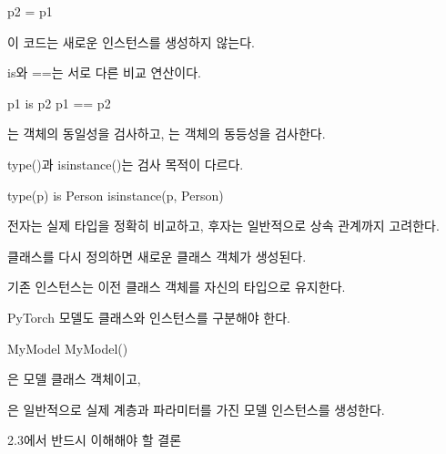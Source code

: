 \begin{dhkcode}
p2 = p1
\end{dhkcode}

이 코드는 새로운 인스턴스를 생성하지 않는다.

\begin{dhknote}
\begin{dhksmry}[centered]
is와 ==는 서로 다른 비교 연산이다.
\end{dhksmry}
\end{dhknote}

\begin{dhkcode}
p1 is p2
p1 == p2
\end{dhkcode}

는 객체의 동일성을 검사하고, \zsh{==}는 객체의 동등성을 검사한다.

\begin{dhknote}
\begin{dhksmry}[centered]
type()과 isinstance()는 검사 목적이 다르다.
\end{dhksmry}
\end{dhknote}

\begin{dhkcode}
type(p) is Person
isinstance(p, Person)
\end{dhkcode}

전자는 실제 타입을 정확히 비교하고, 후자는 일반적으로 상속 관계까지 고려한다.

\begin{dhknote}
\begin{dhksmry}[centered]
클래스를 다시 정의하면 새로운 클래스 객체가 생성된다.
\end{dhksmry}
\end{dhknote}

기존 인스턴스는 이전 클래스 객체를 자신의 타입으로 유지한다.

\begin{dhknote}
\begin{dhksmry}[centered]
PyTorch 모델도 클래스와 인스턴스를 구분해야 한다.
\end{dhksmry}
\end{dhknote}

\begin{dhkcode}
MyModel
MyModel()
\end{dhkcode}

은 모델 클래스 객체이고,

은 일반적으로 실제 계층과 파라미터를 가진 모델 인스턴스를 생성한다.

\begin{dhknote}
\begin{dhksmry}[centered]
2.3에서 반드시 이해해야 할 결론
\end{dhksmry}
\end{dhknote}

